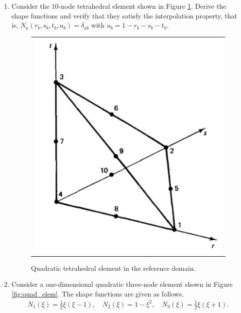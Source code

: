 \documentclass[12pt]{article}
\begin{document}
\begin{enumerate}
\item Consider the 10-node tetrahedral element shown in Figure \ref{fig:tet10}. Derive the shape functions and verify that they satisfy the interpolation property, that is, $N_a(r_b, s_b, t_b, u_b) = \delta_{ab}$ with $u_b = 1 - r_b - s_b - t_b$.

\begin{figure}[h]
	\begin{center}
	\begin{tabular}{c}
\includegraphics[angle=0, trim=0 0 0 0, clip=true, scale = 0.35]{./tet10.pdf}
\end{tabular}
\end{center} 
\caption{Quadratic tetrahedral element in the reference domain.}
\label{fig:tet10}
\end{figure}

\item Consider a one-dimensional quadratic three-node element shown in Figure \ref{fig:quad_elem}. The shape functions are given as follows.
\begin{align*}
N_1(\xi) = \frac12 \xi \left( \xi - 1 \right), \quad N_2(\xi) = 1 -\xi^2, \quad N_3(\xi) = \frac12 \xi \left( \xi + 1 \right).
\end{align*}


\end{enumerate}
\end{document}
